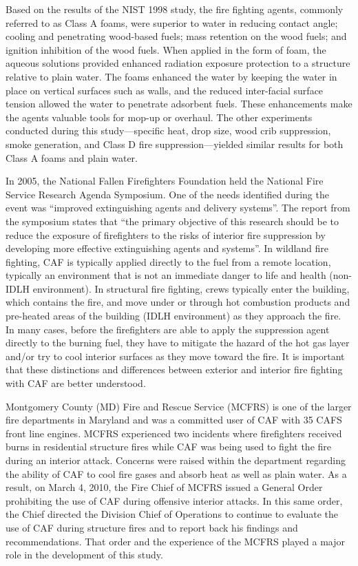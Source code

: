 \documentclass[12pt,oneside]{book}
\begin{document}
Based on the results of the NIST 1998 study, the fire fighting agents, commonly referred to as Class A foams, were superior to water in reducing contact angle; cooling and penetrating wood-based fuels; mass retention on the wood fuels; and ignition inhibition of the wood fuels.  When applied in the form of foam, the aqueous solutions provided enhanced radiation exposure protection to a structure relative to plain water. The foams enhanced the water by keeping the water in place on vertical surfaces such as walls, and the reduced inter-facial surface tension allowed the water to penetrate adsorbent fuels. These enhancements make the agents valuable tools for mop-up or overhaul. The other experiments conducted during this study---specific heat, drop size, wood crib suppression, smoke generation, and Class D fire suppression---yielded similar results for both Class A foams and plain water.

In 2005, the National Fallen Firefighters Foundation held the National Fire Service Research Agenda Symposium.  One of the needs identified during the event was ``improved extinguishing agents and delivery systems''. The report from the symposium states that ``the primary objective of this research should be to reduce the exposure of firefighters to the risks of interior fire suppression by developing more effective extinguishing agents and systems''. In wildland fire fighting, CAF is typically applied directly to the fuel from a remote location, typically an environment that is not an immediate danger to life and health (non-IDLH environment). In structural fire fighting, crews typically enter the building, which contains the fire, and move under or through hot combustion products and pre-heated areas of the building (IDLH environment) as they approach the fire. In many cases, before the firefighters are able to apply the suppression agent directly to the burning fuel, they have to mitigate the hazard of the hot gas layer and/or try to cool interior surfaces as they move toward the fire. It is important that these distinctions and differences between exterior and interior fire fighting with CAF are better understood.

Montgomery County (MD) Fire and Rescue Service (MCFRS) is one of the larger fire departments in Maryland and was a committed user of CAF with 35 CAFS front line engines. MCFRS experienced two incidents where firefighters received burns in residential structure fires while CAF was being used to fight the fire during an interior attack. Concerns were raised within the department regarding the ability of CAF to cool fire gases and absorb heat as well as plain water. As a result, on March 4, 2010, the Fire Chief of MCFRS issued a General Order prohibiting the use of CAF during offensive interior attacks. In this same order, the Chief directed the Division Chief of Operations to continue to evaluate the use of CAF during structure fires and to report back his findings and recommendations. That order and the experience of the MCFRS played a major role in the development of this study.
\end{document}
